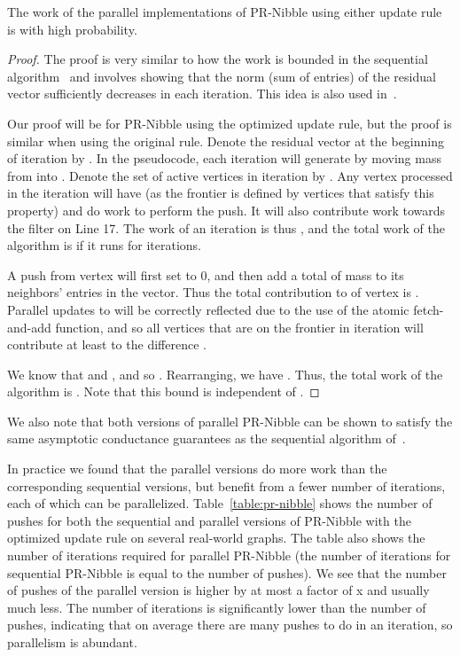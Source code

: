 \begin{theorem}
The work of the parallel implementations of PR-Nibble using either
update rule is  with high probability.
\end{theorem}
\vspace{-7pt}
\begin{proof}
The proof is very similar to how the work is bounded in the sequential
algorithm~\cite{Andersen2006} and involves showing that the  norm
(sum of entries) of the residual vector  sufficiently decreases
in each iteration. This idea is also used in~\cite{Perozzi2014}. 

Our proof will be for PR-Nibble using the optimized update rule, but
the proof is similar when using the original rule.  Denote the
residual vector  at the beginning of iteration  by . In
the pseudocode, each iteration will generate  by moving
mass from  into . Denote the set of active
vertices in iteration  by .  Any vertex  processed in the
iteration will have  (as the frontier is
defined by vertices that satisfy this property) and do  work
to perform the push. It will also contribute  work towards
the filter on Line 17.  The work of an iteration is thus , and the total work of the algorithm is
 if it runs for  iterations.


A push from vertex  will first set  to 0, and then
add a total of  mass to its neighbors' entries
in the  vector.  Thus the total contribution to
 of vertex  is
.  Parallel
updates to  will be correctly reflected due to the use of
the atomic fetch-and-add function, and so all vertices  that are on the
frontier in iteration  will contribute at least  to the difference .

We know that  and ,
and so
. Rearranging, we have
.  Thus, the total
work of the algorithm is . Note that this bound is independent
of .
\end{proof}
\vspace{-7pt}

We also note that both versions of parallel PR-Nibble can be shown to satisfy the same asymptotic
conductance guarantees as the sequential algorithm
of~\cite{Andersen2006}. 


In practice we found that the parallel versions do more work than the
corresponding sequential versions, but benefit from a fewer number of
iterations, each of which can be
parallelized. Table~\ref{table:pr-nibble} shows the number of pushes
for both the sequential and parallel versions of PR-Nibble with the
optimized update rule on several real-world graphs. The table also
shows the number of iterations required for parallel PR-Nibble (the
number of iterations for sequential PR-Nibble is equal to the number
of pushes). We see that the number of pushes of the parallel version
is higher by at most a factor of x and usually much less. The
number of iterations is significantly lower than the number of pushes,
indicating that on average there are many pushes to do in an
iteration, so parallelism is abundant.


